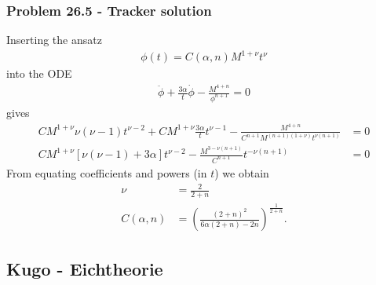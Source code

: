 \documentclass[10pt,a4paper]{book}
\theoremstyle{definition}
\begin{document}
\subsubsection{Problem 26.5 - Tracker solution}
Inserting the ansatz
\begin{align}
    \phi(t)=C(\alpha,n)M^{1+\nu}t^\nu
\end{align}
into the ODE
\begin{align}
    \ddot\phi+\frac{3\alpha}{t}\dot\phi-\frac{M^{4+n}}{\phi^{n+1}}=0
\end{align}
gives
\begin{align}
    CM^{1+\nu}\nu(\nu-1)t^{\nu-2}+CM^{1+\nu}\frac{3\alpha}{t}t^{\nu-1}-\frac{M^{4+n}}{C^{n+1}M^{(n+1)(1+\nu)}t^{\nu(n+1)}}&=0\\
    CM^{1+\nu}\left[\nu(\nu-1)+3\alpha\right]t^{\nu-2}-\frac{M^{3-\nu(n+1)}}{C^{n+1}}t^{-\nu(n+1)}&=0
\end{align}
From equating coefficients and powers (in $t$) we obtain
\begin{align}
    \nu&=\frac{2}{2+n}\\
    C(\alpha,n)&=\left(\frac{(2+n)^2}{6\alpha(2+n)-2n}\right)^\frac{1}{2+n}.
\end{align}

\newpage
\subsection{{\sc Kugo} - Eichtheorie}
\end{document}
